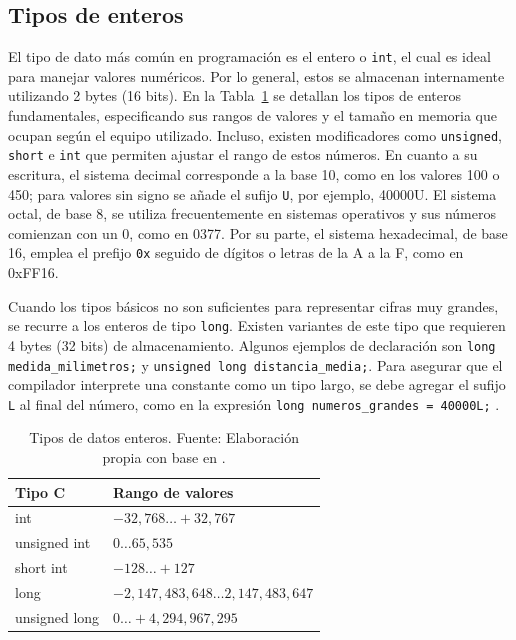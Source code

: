 \subsection{Tipos de enteros}

El tipo de dato más común en programación es el entero o \texttt{int}, el cual es ideal para manejar valores numéricos. Por lo general, estos se almacenan internamente utilizando 2 bytes (16 bits). En la Tabla~\ref{tab:enteros} se detallan los tipos de enteros fundamentales, especificando sus rangos de valores y el tamaño en memoria que ocupan según el equipo utilizado. Incluso, existen modificadores como \texttt{unsigned}, \texttt{short} e \texttt{int} que permiten ajustar el rango de estos números. En cuanto a su escritura, el sistema decimal corresponde a la base 10, como en los valores 100 o 450; para valores sin signo se añade el sufijo \texttt{U}, por ejemplo, 40000U. El sistema octal, de base 8, se utiliza frecuentemente en sistemas operativos y sus números comienzan con un 0, como en 0377. Por su parte, el sistema hexadecimal, de base 16, emplea el prefijo \texttt{0x} seguido de dígitos o letras de la A a la F, como en 0xFF16.

Cuando los tipos básicos no son suficientes para representar cifras muy grandes, se recurre a los enteros de tipo \texttt{long}. Existen variantes de este tipo que requieren 4 bytes (32 bits) de almacenamiento. Algunos ejemplos de declaración son \texttt{long medida\_milimetros;} y \texttt{unsigned long distancia\_media;}. Para asegurar que el compilador interprete una constante como un tipo largo, se debe agregar el sufijo \texttt{L} al final del número, como en la expresión \texttt{long numeros\_grandes = 40000L;} \cite{frem_ref2}.

\begin{table}[H]
    \centering
    \begin{tabular}{|p{3cm}|p{7cm}|}
        \hline
        \textbf{Tipo C} & \textbf{Rango de valores} \\
        \hline
        
        int & $-32,768 \dots +32,767$ \\
        \hline

        unsigned int & $0 \dots 65,535$ \\
        \hline

        short int & $-128 \dots +127$ \\
        \hline

        long & $-2,147,483,648 \dots 2,147,483,647$ \\
        \hline

        unsigned long & $0 \dots +4,294,967,295$ \\
        \hline

    \end{tabular}
    \caption{Tipos de datos enteros. Fuente: Elaboración propia con base en \cite{frem_ref2}.}
    \label{tab:enteros}
\end{table}

